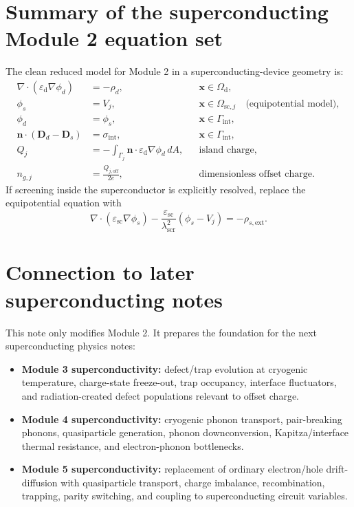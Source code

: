 \documentclass[11pt]{article}
\newcommand{\Dvec}{\mathbf{D}}
\newcommand{\nvecb}{\mathbf{n}}
\newcommand{\Omd}{\Omega_{\mathrm{d}}}
\newcommand{\Gint}{\Gamma_{\mathrm{int}}}
\newcommand{\epsd}{\varepsilon_{\mathrm{d}}}
\newcommand{\epssc}{\varepsilon_{\mathrm{sc}}}
\newcommand{\lams}{\lambda_{\mathrm{scr}}}
\begin{document}
\section{Summary of the superconducting Module 2 equation set}

The clean reduced model for Module 2 in a superconducting-device geometry is:
\begin{align}
\nabla\cdot(\epsd\nabla\phi_d)&=-\rho_d, && \mathbf{x}\in\Omd,\\
\phi_s&=V_j, && \mathbf{x}\in\Omega_{\mathrm{sc},j}\quad\text{(equipotential model)},\\
\phi_d&=\phi_s, && \mathbf{x}\in\Gint,\\
\nvecb\cdot(\Dvec_d-\Dvec_s)&=\sigma_{\mathrm{int}}, && \mathbf{x}\in\Gint,\\
Q_j&=-\int_{\Gamma_j}\nvecb\cdot\epsd\nabla\phi_d\,dA,&&\text{island charge},\\
n_{g,j}&=\frac{Q_{j,\mathrm{off}}}{2e},&&\text{dimensionless offset charge}.
\end{align}
If screening inside the superconductor is explicitly resolved, replace the equipotential equation with
\begin{equation}
\nabla\cdot(\epssc\nabla\phi_s)-\frac{\epssc}{\lams^2}(\phi_s-V_j)=-\rho_{s,\mathrm{ext}}.
\end{equation}

\section{Connection to later superconducting notes}

This note only modifies Module 2. It prepares the foundation for the next superconducting physics notes:
\begin{itemize}[leftmargin=2em]
\item \textbf{Module 3 superconductivity:} defect/trap evolution at cryogenic temperature, charge-state freeze-out, trap occupancy, interface fluctuators, and radiation-created defect populations relevant to offset charge.
\item \textbf{Module 4 superconductivity:} cryogenic phonon transport, pair-breaking phonons, quasiparticle generation, phonon downconversion, Kapitza/interface thermal resistance, and electron-phonon bottlenecks.
\item \textbf{Module 5 superconductivity:} replacement of ordinary electron/hole drift-diffusion with quasiparticle transport, charge imbalance, recombination, trapping, parity switching, and coupling to superconducting circuit variables.
\end{itemize}
\end{document}

